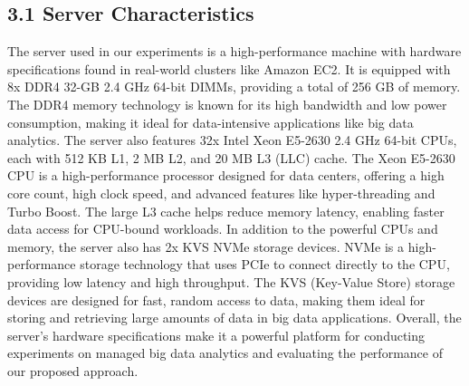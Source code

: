 \documentclass[twocolumn,10pt]{asme2e}
\begin{document}
\subsection*{3.1 Server Characteristics}
The server used in our experiments is a high-performance machine with hardware specifications found in real-world clusters like Amazon EC2. It is equipped with 8x DDR4 32-GB 2.4 GHz 64-bit DIMMs, providing a total of 256 GB of memory. The DDR4 memory technology is known for its high bandwidth and low power consumption, making it ideal for data-intensive applications like big data analytics. The server also features 32x Intel Xeon E5-2630 2.4 GHz 64-bit CPUs, each with 512 KB L1, 2 MB L2, and 20 MB L3 (LLC) cache. The Xeon E5-2630 CPU is a high-performance processor designed for data centers, offering a high core count, high clock speed, and advanced features like hyper-threading and Turbo Boost. The large L3 cache helps reduce memory latency, enabling faster data access for CPU-bound workloads. In addition to the powerful CPUs and memory, the server also has 2x KVS NVMe storage devices. NVMe is a high-performance storage technology that uses PCIe to connect directly to the CPU, providing low latency and high throughput. The KVS (Key-Value Store) storage devices are designed for fast, random access to data, making them ideal for storing and retrieving large amounts of data in big data applications. Overall, the server's hardware specifications make it a powerful platform for conducting experiments on managed big data analytics and evaluating the performance of our proposed approach. 
\end{document}
